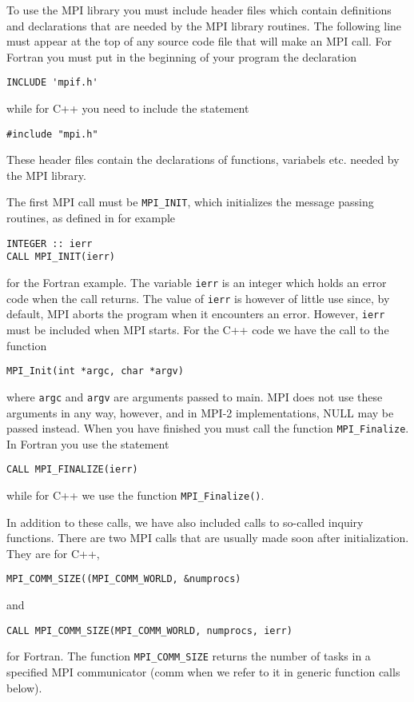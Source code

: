 To use the MPI library you must include header files which contain definitions 
and declarations that are needed by the MPI library routines. 
The following line must appear at the top of any source code file that will make an MPI call.  
For Fortran you must put in the beginning of your program the declaration
\begin{lstlisting}
INCLUDE 'mpif.h'
\end{lstlisting} 
while for C++ you need to include the statement 
\begin{lstlisting}
#include "mpi.h"
\end{lstlisting}
These header files contain the declarations of functions, variabels etc. needed by the MPI library.

The first MPI call must be \lstinline{MPI_INIT}, which initializes the message passing routines, as defined in for example 
\begin{lstlisting}
INTEGER :: ierr
CALL MPI_INIT(ierr)
\end{lstlisting} for the Fortran example. 
The variable \lstinline{ierr} is an integer which holds an error code when the call returns.
The value of \lstinline{ierr} is however of little use since, 
by default, MPI aborts the program when it encounters an error. 
However, \lstinline{ierr} must be included when MPI starts.
For the C++ code we have the call to 
the function 
\begin{lstlisting}
MPI_Init(int *argc, char *argv)
\end{lstlisting}where 
\lstinline{argc} and \lstinline{argv} are arguments passed to main. MPI does not use these arguments in any way, 
however, and in MPI-2 implementations, NULL may be passed instead.
When you have finished you must call the function 
\lstinline{MPI_Finalize}. In Fortran you use the statement 
\begin{lstlisting}
CALL MPI_FINALIZE(ierr)
\end{lstlisting} 
while for C++ we use the function
\lstinline{MPI_Finalize()}.

In addition to these calls, we have also included calls to so-called 
inquiry functions. There are two 
MPI calls that are usually made soon after initialization. They are for C++, 
\begin{lstlisting}
MPI_COMM_SIZE((MPI_COMM_WORLD, &numprocs)
\end{lstlisting}  
and
\begin{lstlisting} 
CALL MPI_COMM_SIZE(MPI_COMM_WORLD, numprocs, ierr)
\end{lstlisting}
for Fortran.  
The function \lstinline{MPI_COMM_SIZE} returns the number of 
tasks in a specified MPI communicator (comm when we refer to it in generic function calls below). 

